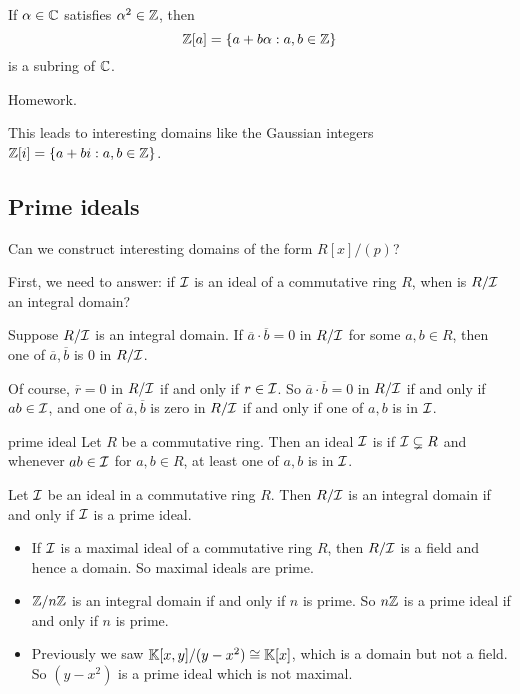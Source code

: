 \documentclass[12pt,letterpaper]{report}
\begin{document}
\begin{prop}{}{}
  If $\alpha \in \mathbb{C}$ satisfies $\alpha^2 \in \mathbb{Z}$, then
  \[ \mathbb{Z}[a] = \{a + b\alpha : a, b \in \mathbb{Z}\} \]
  is a subring of $\mathbb{C}$.
\end{prop}

\begin{thmproof}
  Homework.
\end{thmproof}

This leads to interesting domains like the Gaussian integers $\mathbb{Z}[i] = \{a + bi : a, b \in \mathbb{Z}\}$.

\pagebreak
\subsection{Prime ideals}

Can we construct interesting domains of the form $R[x]/(p)$?

First, we need to answer: if $\mathcal{I}$ is an ideal of a commutative ring $R$, when is $R/\mathcal{I}$ an
integral domain?

Suppose $R/\mathcal{I}$ is an integral domain.
If $\overline{a} \cdot \overline{b} = 0$ in $R/\mathcal{I}$ for some $a, b \in R$, then one of
$\overline{a}, \overline{b}$ is 0 in $R/\mathcal{I}$.

Of course, $\overline{r} = 0$ in $R/\mathcal{I}$ if and only if $r \in \mathcal{I}$.
So $\overline{a} \cdot \overline{b} = 0$ in $R/\mathcal{I}$ if and only if $ab \in \mathcal{I}$, and one of
$\overline{a}, \overline{b}$ is zero in $R/\mathcal{I}$ if and only if one of $a, b$ is in $\mathcal{I}$.

\begin{defn}{prime ideal}{}
  Let $R$ be a commutative ring.
  Then an ideal $\mathcal{I}$ is  if $\mathcal{I} \subsetneq R$ and whenever $ab \in \mathcal{I}$ for
  $a, b \in R$, at least one of $a, b$ is in $\mathcal{I}$.
\end{defn}

\begin{thm}{}{}
  Let $\mathcal{I}$ be an ideal in a commutative ring $R$.
  Then $R/\mathcal{I}$ is an integral domain if and only if $\mathcal{I}$ is a prime ideal.
\end{thm}

\begin{ex}
  \begin{itemize}
    \item If $\mathcal{I}$ is a maximal ideal of a commutative ring $R$, then $R/\mathcal{I}$ is a field and
    hence a domain.
    So maximal ideals are prime.
    \item $\mathbb{Z}/{n}\mathbb{Z}$ is an integral domain if and only if $n$ is prime.
    So $n\mathbb{Z}$ is a prime ideal if and only if $n$ is prime.
    \item Previously we saw $\mathbb{K}[x, y]/(y - x^2) \cong \mathbb{K}[x]$, which is a domain but
    not a field.
    So $(y - x^2)$ is a prime ideal which is not maximal.
  \end{itemize}
\end{ex}
\end{document}
